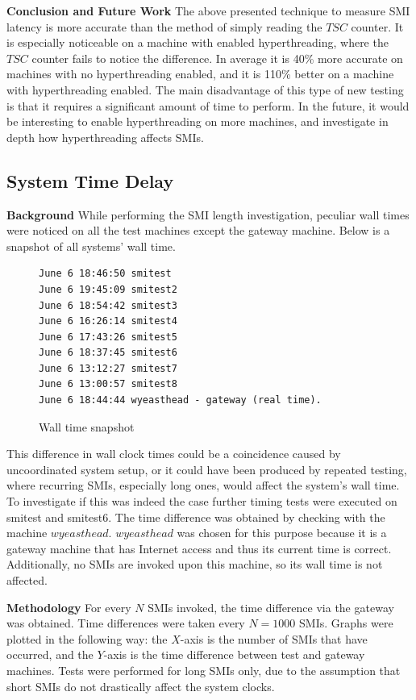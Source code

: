 \documentclass{IEEEtran}
\begin{document}
\textbf{Conclusion and Future Work}
The above presented technique to measure SMI latency is more accurate than the method of simply reading the $TSC$ counter. It is especially noticeable on a machine with enabled hyperthreading, where the $TSC$ counter fails to notice the difference. In average it is 40\% more accurate on machines with no hyperthreading enabled, and it is 110\% better on a machine with hyperthreading enabled. The main disadvantage of this type of new testing is that it requires a significant amount of time to perform. In the future, it would be interesting to enable hyperthreading on more machines, and investigate in depth how hyperthreading affects SMIs.

\subsection{System Time Delay}\label{sub:km_system_time}
\textbf{Background}
While performing the SMI length investigation, peculiar wall times were noticed on all the test machines except the gateway machine. Below is a snapshot of all systems' wall time.

\begin{figure}[t]
\begin{lstlisting}
June 6 18:46:50 smitest
June 6 19:45:09 smitest2
June 6 18:54:42 smitest3
June 6 16:26:14 smitest4
June 6 17:43:26 smitest5
June 6 18:37:45 smitest6
June 6 13:12:27 smitest7
June 6 13:00:57 smitest8
June 6 18:44:44 wyeasthead - gateway (real time).
\end{lstlisting}
\caption[Wall time snapshot]{Wall time snapshot}
\label{km_timesnapshot}
\end{figure}

This difference in wall clock times could be a coincidence caused by uncoordinated system setup, or it could have been produced by repeated testing, where recurring SMIs, especially long ones, would affect the system's wall time. To investigate if this was indeed the case further timing tests were executed on smitest and smitest6. The time difference was obtained by checking with the machine $wyeasthead$. $wyeasthead$ was chosen for this purpose because it is a gateway machine that has Internet access and thus its current time is correct. Additionally, no SMIs are invoked upon this machine, so its wall time is not affected.

\textbf{Methodology}
For every $N$ SMIs invoked, the time difference via the gateway was obtained. Time differences were taken every $N=1000$ SMIs. Graphs were plotted in the following way: the $X$-axis is the number of SMIs that have occurred, and the $Y$-axis is the time difference between test and gateway machines. Tests were performed for long SMIs only, due to the assumption that short SMIs do not drastically affect the system clocks.
\end{document}
